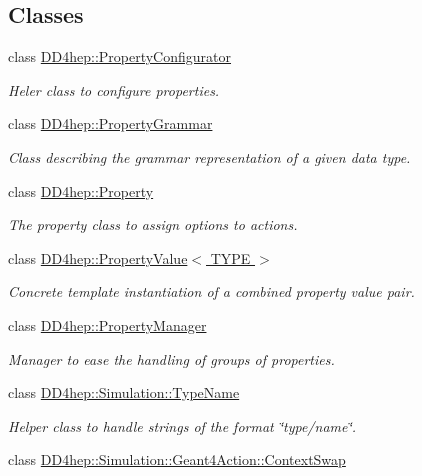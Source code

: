 \subsection*{Classes}
\begin{DoxyCompactItemize}
\item 
class \hyperlink{class_d_d4hep_1_1_property_configurator}{D\+D4hep\+::\+Property\+Configurator}
\begin{DoxyCompactList}\small\item\em Heler class to configure properties. \end{DoxyCompactList}\item 
class \hyperlink{class_d_d4hep_1_1_property_grammar}{D\+D4hep\+::\+Property\+Grammar}
\begin{DoxyCompactList}\small\item\em Class describing the grammar representation of a given data type. \end{DoxyCompactList}\item 
class \hyperlink{class_d_d4hep_1_1_property}{D\+D4hep\+::\+Property}
\begin{DoxyCompactList}\small\item\em The property class to assign options to actions. \end{DoxyCompactList}\item 
class \hyperlink{class_d_d4hep_1_1_property_value}{D\+D4hep\+::\+Property\+Value$<$ T\+Y\+P\+E $>$}
\begin{DoxyCompactList}\small\item\em Concrete template instantiation of a combined property value pair. \end{DoxyCompactList}\item 
class \hyperlink{class_d_d4hep_1_1_property_manager}{D\+D4hep\+::\+Property\+Manager}
\begin{DoxyCompactList}\small\item\em Manager to ease the handling of groups of properties. \end{DoxyCompactList}\item 
class \hyperlink{class_d_d4hep_1_1_simulation_1_1_type_name}{D\+D4hep\+::\+Simulation\+::\+Type\+Name}
\begin{DoxyCompactList}\small\item\em Helper class to handle strings of the format \char`\"{}type/name\char`\"{}. \end{DoxyCompactList}\item 
class \hyperlink{class_d_d4hep_1_1_simulation_1_1_geant4_action_1_1_context_swap}{D\+D4hep\+::\+Simulation\+::\+Geant4\+Action\+::\+Context\+Swap}

\end{DoxyCompactItemize}
